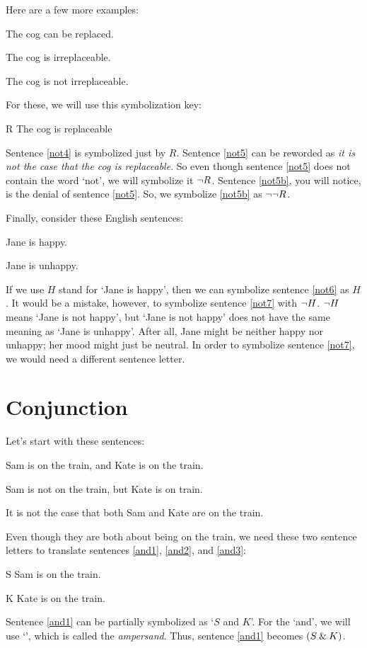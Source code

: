 Here are a few more examples:
	\begin{earg}
		\item[\ex{not4}] The cog can be replaced.
		\item[\ex{not5}] The cog is irreplaceable.
		\item[\ex{not5b}] The cog is not irreplaceable.
	\end{earg}
For these, we will use this symbolization key:
	\begin{ekey}
		\item[R] The cog is replaceable
	\end{ekey}
Sentence \ref{not4} is symbolized just by $R$. Sentence \ref{not5} can be reworded as \textit{it is not the case that the cog is replaceable}. So even though sentence \ref{not5} does not contain the word `not', we will symbolize it ${\neg} R$.
Sentence \ref{not5b}, you will notice, is the denial of sentence \ref{not5}. So, we symbolize \ref{not5b} as ${\neg}{\neg} R$.

Finally, consider these English sentences:
	\begin{earg}
		\item[\ex{not6}] Jane is happy.
		\item[\ex{not7}] Jane is unhappy.
	\end{earg}
If we use $H$ stand for `Jane is happy', then we can symbolize sentence \ref{not6} as $H$. It would be a mistake, however, to symbolize sentence \ref{not7} with ${\neg}{H}$. 
${\neg}{H}$ means `Jane is not happy', but `Jane is not happy' does not have the same meaning as `Jane is unhappy'. After all, Jane might be neither happy nor unhappy; her mood might just be neutral. In order to symbolize sentence \ref{not7}, we would need a different sentence letter.


\section{Conjunction}
\label{s:ConnectiveConjunction}

Let's start with these sentences:
	\begin{earg}
		\item[\ex{and1}] Sam is on the train, and Kate is on the train.
		\item[\ex{and2}] Sam is not on the train, but Kate is on train.
		\item[\ex{and3}] It is not the case that both Sam and Kate are on the train.
	\end{earg}
Even though they are both about being on the train, we need these two sentence letters to translate sentences \ref{and1}, \ref{and2}, and \ref{and3}:
	\begin{ekey}
		\item[S] Sam is on the train.
		\item[K] Kate is on the train.
	\end{ekey}
Sentence \ref{and1} can be partially symbolized as `$S$ and $K$'. For the `and', we will use `\eand', which is called the \textit{ampersand}. Thus, sentence \ref{and1} becomes $(S\mathbin{\&} K)$. 

